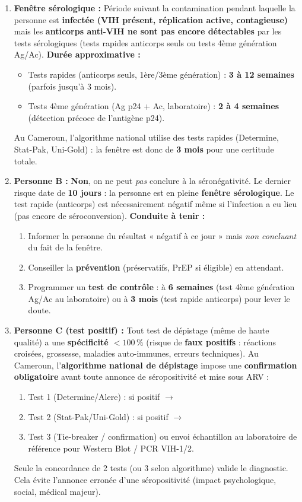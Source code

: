 \documentclass[11pt]{article}
\begin{document}
\begin{corrige}
\begin{enumerate}
\item \textbf{Fenêtre sérologique :} Période suivant la contamination pendant laquelle la personne est \textbf{infectée (VIH présent, réplication active, contagieuse)} mais les \textbf{anticorps anti-VIH ne sont pas encore détectables} par les tests sérologiques (tests rapides anticorps seuls ou tests 4ème génération Ag/Ac).
\textbf{Durée approximative :}
\begin{itemize}
\item Tests rapides (anticorps seuls, 1ère/3ème génération) : \textbf{3 à 12 semaines} (parfois jusqu'à 3 mois).
\item Tests 4ème génération (Ag p24 + Ac, laboratoire) : \textbf{2 à 4 semaines} (détection précoce de l'antigène p24).
\end{itemize}
Au Cameroun, l'algorithme national utilise des tests rapides (Determine, Stat-Pak, Uni-Gold) : la fenêtre est donc de \textbf{3 mois} pour une certitude totale.
\item \textbf{Personne B :} \textbf{Non}, on ne peut \emph{pas} conclure à la séronégativité. Le dernier risque date de \textbf{10 jours} : la personne est en pleine \textbf{fenêtre sérologique}. Le test rapide (anticorps) est nécessairement négatif même si l'infection a eu lieu (pas encore de séroconversion).
\textbf{Conduite à tenir :}
\begin{enumerate}
\item Informer la personne du résultat « négatif à ce jour » mais \emph{non concluant} du fait de la fenêtre.
\item Conseiller la \textbf{prévention} (préservatifs, PrEP si éligible) en attendant.
\item Programmer un \textbf{test de contrôle} : à \textbf{6 semaines} (test 4ème génération Ag/Ac au laboratoire) ou à \textbf{3 mois} (test rapide anticorps) pour lever le doute.
\end{enumerate}
\item \textbf{Personne C (test positif) :} Tout test de dépistage (même de haute qualité) a une \textbf{spécificité $< 100\,\%$} (risque de \textbf{faux positifs} : réactions croisées, grossesse, maladies auto-immunes, erreurs techniques). Au Cameroun, l'\textbf{algorithme national de dépistage} impose une \textbf{confirmation obligatoire} avant toute annonce de séropositivité et mise sous ARV :
\begin{enumerate}
\item Test 1 (Determine/Alere) : si positif $\to$
\item Test 2 (Stat-Pak/Uni-Gold) : si positif $\to$
\item Test 3 (Tie-breaker / confirmation) ou envoi échantillon au laboratoire de référence pour Western Blot / PCR VIH-1/2.
\end{enumerate}
Seule la concordance de 2 tests (ou 3 selon algorithme) valide le diagnostic. Cela évite l'annonce erronée d'une séropositivité (impact psychologique, social, médical majeur).
\end{enumerate}
\end{corrige}
\end{document}
